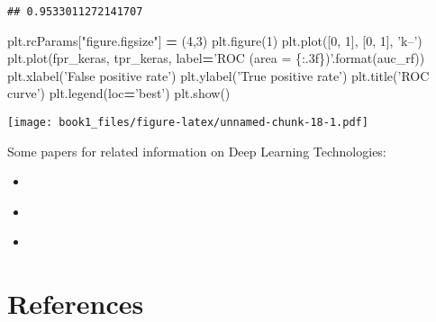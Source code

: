 \documentclass[]{book}
\newenvironment{Shaded}{\begin{snugshade}}{\end{snugshade}}
\newcommand{\BuiltInTok}[1]{#1}
\newcommand{\DecValTok}[1]{\textcolor[rgb]{0.00,0.00,0.81}{#1}}
\newcommand{\NormalTok}[1]{#1}
\newcommand{\OperatorTok}[1]{\textcolor[rgb]{0.81,0.36,0.00}{\textbf{#1}}}
\newcommand{\SpecialCharTok}[1]{\textcolor[rgb]{0.00,0.00,0.00}{#1}}
\newcommand{\StringTok}[1]{\textcolor[rgb]{0.31,0.60,0.02}{#1}}
\providecommand{\tightlist}{%
  \setlength{\itemsep}{0pt}\setlength{\parskip}{0pt}}
\begin{document}
\begin{verbatim}
## 0.9533011272141707
\end{verbatim}

\begin{Shaded}
\begin{Highlighting}[]
\NormalTok{plt.rcParams[}\StringTok{"figure.figsize"}\NormalTok{] }\OperatorTok{=}\NormalTok{ (}\DecValTok{4}\NormalTok{,}\DecValTok{3}\NormalTok{)}
\NormalTok{plt.figure(}\DecValTok{1}\NormalTok{)}
\NormalTok{plt.plot([}\DecValTok{0}\NormalTok{, }\DecValTok{1}\NormalTok{], [}\DecValTok{0}\NormalTok{, }\DecValTok{1}\NormalTok{], }\StringTok{'k--'}\NormalTok{)}
\NormalTok{plt.plot(fpr_keras, tpr_keras, label}\OperatorTok{=}\StringTok{'ROC (area = }\SpecialCharTok{\{:.3f\}}\StringTok{)'}\NormalTok{.}\BuiltInTok{format}\NormalTok{(auc_rf))}
\NormalTok{plt.xlabel(}\StringTok{'False positive rate'}\NormalTok{)}
\NormalTok{plt.ylabel(}\StringTok{'True positive rate'}\NormalTok{)}
\NormalTok{plt.title(}\StringTok{'ROC curve'}\NormalTok{)}
\NormalTok{plt.legend(loc}\OperatorTok{=}\StringTok{'best'}\NormalTok{)}
\NormalTok{plt.show()}
\end{Highlighting}
\end{Shaded}

\texttt{[image: book1\_files/figure-latex/unnamed-chunk-18-1.pdf]}

Some papers for related information on Deep Learning Technologies:

\begin{itemize}
\tightlist
\item
  \citep{bhandary2020deep}
\item
  \citep{lakshmi2019convolutional}
\item
  \citep{xie2015}
\end{itemize}

\hypertarget{references}{%
\chapter*{References}\label{references}}


\end{document}
